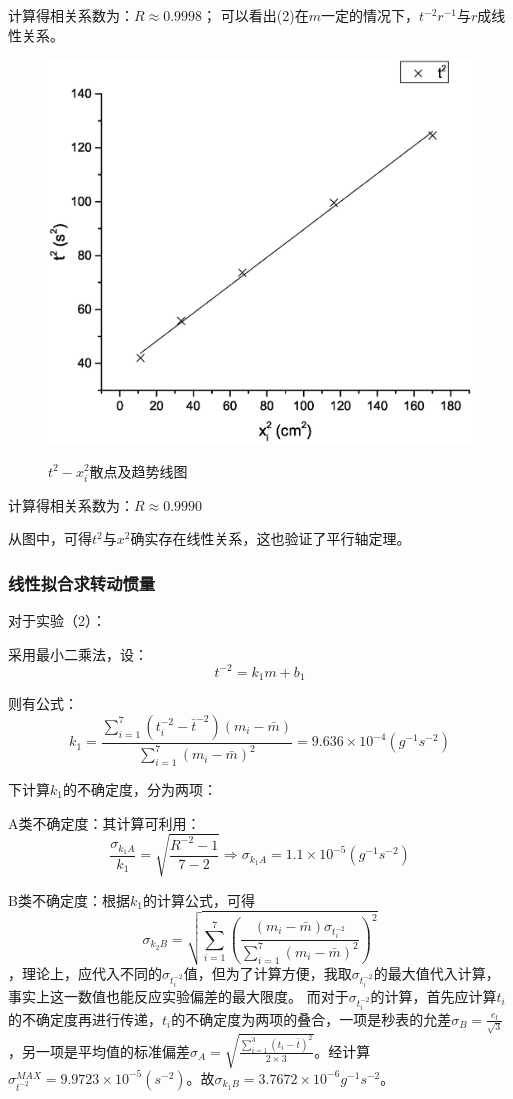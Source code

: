 \documentclass{ctexart}
\begin{document}
      计算得相关系数为：$R\approx0.9998$；     
      可以看出(2)在$m$一定的情况下，$t^{-2}r^{-1}$与$r$成线性关系。
      \begin{figure}[H]
        \centering
        \caption{$t^2-x_i^2$散点及趋势线图}
        \includegraphics[width=1.0\textwidth]{3}
        \label{fig:digit}
      \end{figure}
      计算得相关系数为：$R\approx0.9990$
      
      从图中，可得$t^2$与$x^2$确实存在线性关系，这也验证了平行轴定理。
      \subsubsection{线性拟合求转动惯量}
      对于实验（2）：

      采用最小二乘法，设：$$t^{-2}=k_1m+b_1$$
      
      则有公式：$$k_1=\frac{\sum\limits_{i=1}^7{(t_i^{-2}-\bar{t}^{-2})}(m_i-\bar{m})}{\sum\limits_{i=1}^7{(m_i-\bar{m})^2}}=9.636\times10^{-4}(g^{-1}s^{-2})$$

      下计算$k_1$的不确定度，分为两项：
      
      A类不确定度：其计算可利用：$$\frac{\sigma_{k_1A}}{k_1}=\sqrt{\frac{R^{-2}-1}{7-2}}\Rightarrow\sigma_{k_1A}=1.1\times10^{-5}(g^{-1}s^{-2})$$

      B类不确定度：根据$k_1$的计算公式，可得$$\sigma_{k_2B}=\sqrt{\sum\limits_{i=1}^7({\frac{(m_i-\bar{m})\sigma_{t^{-2}_i}}{\sum\limits_{i=1}^7{(m_i-\bar{m})^2}}})^2}$$，理论上，应代入不同的$\sigma_{t^{-2}_i}$值，但为了计算方便，我取$\sigma_{t_i^{-2}}$的最大值代入计算，事实上这一数值也能反应实验偏差的最大限度。
      而对于$\sigma_{t_i^{-2}}$的计算，首先应计算$t_i$的不确定度再进行传递，$t_i$的不确定度为两项的叠合，一项是秒表的允差$\sigma_B=\frac{e_t}{\sqrt{3}}$，另一项是平均值的标准偏差$\sigma_A=\sqrt{{\frac{\sum\limits_{i=1}^3(t_i-\bar{t})^2}{2\times3}}}$。经计算$\sigma_{t^{-2}}^{MAX}=9.9723\times10^{-5}(s^{-2})$。故$\sigma_{k_1B}=3.7672\times10^{-6}{g^{-1}s^{-2}}$。
\end{document}
